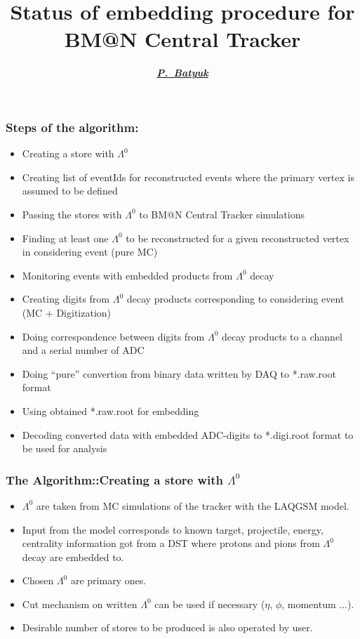 \documentclass[dvipsnames] {beamer}
\title[\bf BERDS Meeting, March 5]
      {\textbf{\large {{\color{darkred!70!black} Status of embedding procedure for \\ BM@N Central Tracker}}}}
\author[\bf P.~Batyuk]{\textit{\textbf{{\footnotesize \underline{P.~Batyuk}}}}}
\begin{document}
      \maketitle

       \begin{frame}
         \frametitle{\bf \centering Steps of the algorithm:}
         \bf \footnotesize
         \begin{itemize}
         \item Creating a store with $\Lambda^{0}$
         \item Creating list of eventIds for reconstructed events where the primary vertex is assumed to be defined
         \item Passing the stores with $\Lambda^{0}$ to BM@N Central Tracker simulations
         \item Finding at least one $\Lambda^{0}$ to be reconstructed for a given reconstructed vertex in considering event (pure MC)
         \item Monitoring events with embedded products from $\Lambda^{0}$ decay
         \item Creating digits from $\Lambda^{0}$ decay products corresponding to considering event (MC + Digitization)
         \item Doing correspondence between digits from $\Lambda^{0}$ decay products to a channel and a serial number of ADC
         \item Doing ``pure'' convertion from binary data written by DAQ to *.raw.root format
         \item Using obtained *.raw.root for embedding
         \item Decoding converted data with embedded ADC-digits to *.digi.root format to be used for analysis
         \end{itemize}
       \end{frame}

        \begin{frame}
          \frametitle{\bf \centering The Algorithm::Creating a store with $\Lambda^{0}$}
          \bf
          \begin{itemize}
          \item $\Lambda^{0}$ are taken from MC simulations of the tracker with the LAQGSM model.
          \item Input from the model corresponds to known target, projectile, energy, centrality information got from
            a DST where protons and pions from $\Lambda^{0}$ decay are embedded to.
          \item Chosen $\Lambda^{0}$ are primary ones.
          \item Cut mechanism on written $\Lambda^{0}$ can be used if necessary ($\eta$, $\phi$, momentum ...).
          \item Desirable number of stores to be produced is also operated by user.
          \end{itemize}

        \end{frame}
\end{document}
